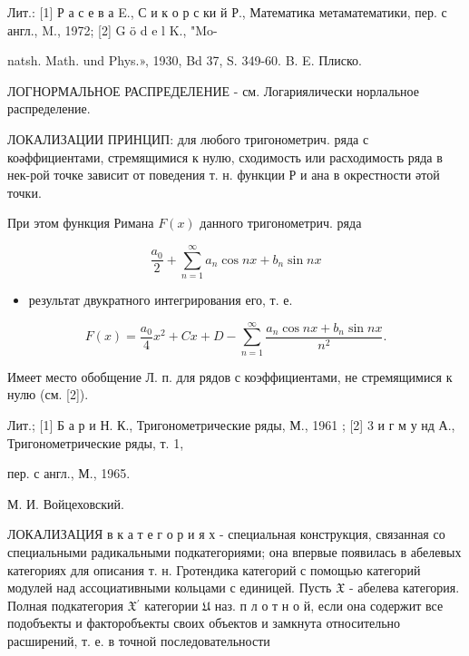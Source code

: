\documentclass[10pt]{article}
\begin{document}
Лит.: [1] Р а с е в а E., С и к о р с ки й Р., Математика метаматематики, пер. с англ., M., 1972; [2] G ö d e l K., "Mo-

natsh. Math. und Phys.», 1930, Bd 37, S. 349-60. B. E. Плиско.



ЛОГНОРМАЛЬНОЕ РАСПРЕДЕЛЕНИЕ - см. Логариялически норлальное распределение.



ЛОКАЛИЗАЦИИ ПРИНЦИП: для любого тригонометрич. ряда с коәффициентами, стремящимися к нулю, сходимость или расходимость ряда в нек-рой точке зависит от поведения т. н. функции Р и ана в окрестности әтой точки.



При этом функция Римана $F(x)$ данного тригонометрич. ряда



\[

\frac{a_{0}}{2}+\sum_{n=1}^{\infty} a_{n} \cos n x+b_{n} \sin n x

\]



\begin{itemize}

  \item результат двукратного интегрирования его, т. е.

\end{itemize}



\[

F(x)=\frac{a_{0}}{4} x^{2}+C x+D-\sum_{n=1}^{\infty} \frac{a_{n} \cos n x+b_{n} \sin n x}{n^{2}} .

\]



Имеет место обобщение Л. п. для рядов с коэффициентами, не стремящимися к нулю (см. [2]).



Лит.; [1] Б а р и Н. К., Тригонометрические ряды, М., 1961 ; [2] 3 и г м у нд А., Тригонометрические ряды, т. 1,

пер. с англ., М., 1965.

М. И. Войцеховский.



ЛОКАЛИЗАЦИЯ в к а т е г о р и я х - специальная конструкция, связанная со специальными радикальными подкатегориями; она впервые появилась в абелевых категориях для описания т. н. Гротендика категорий с помощью категорий модулей над ассоциативными кольцами с единицей. Пусть $\mathfrak{X}$ - абелева категория. Полная подкатегория $\mathfrak{\mathfrak { X }}{ }^{\prime}$ категории $\mathfrak{U}$ наз. п л о т н о й, если она содержит все подобъекты и факторобъекты своих объектов и замкнута относительно расширений, т. е. в точной последовательности
\end{document}
